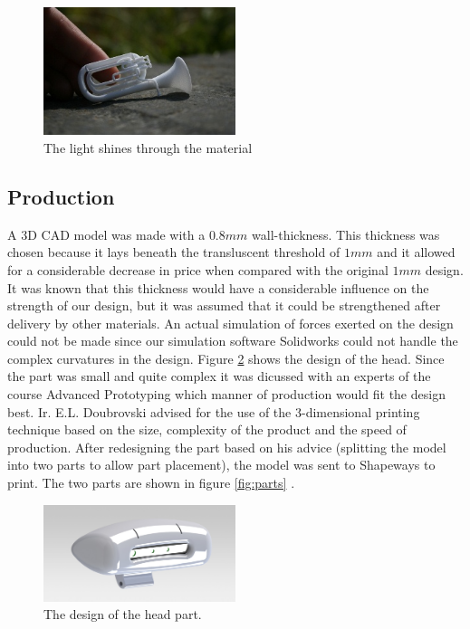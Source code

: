 \documentclass[technical_document.tex]{subfiles}
\begin{document}
\begin{figure}[h]
	\centering
	\mbox{\includegraphics[width=0.5\textwidth]{Images/polish_horn_finger_thumb.png}}
	\caption{The light shines through the material}
	\label{fig:finger}
\end{figure}

\subsection{Production}
A 3D CAD model was made with a $0.8 mm$ wall-thickness. This thickness was chosen because it lays beneath the transluscent threshold of $1 mm$ and it allowed for a considerable decrease in price when compared with the original $1 mm$ design. It was known that this thickness would have a considerable influence on the strength of our design, but it was assumed that it could be strengthened after delivery by other materials. An actual simulation of forces exerted on the design could not be made since our simulation software Solidworks could not handle the complex curvatures in the design. Figure \ref{fig:head} shows the design of the head. Since the part was small and quite complex it was dicussed with an experts of the course Advanced Prototyping which manner of production would fit the design best. Ir. E.L. Doubrovski advised for the use of the 3-dimensional printing technique based on the size, complexity of the product and the speed of production. After redesigning the part based on his advice (splitting the model into two parts to allow part placement), the model was sent to Shapeways to print. The two parts are shown in figure \ref{fig:parts} .

\begin{figure}[h]
	\centering
	\mbox{\includegraphics[width=0.5\textwidth]{Images/SW_fullheadmodel.png}}
	\caption{The design of the head part.}
	\label{fig:head}
\end{figure}
\end{document}
